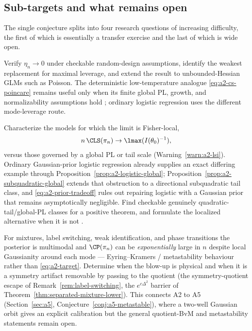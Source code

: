 \documentclass[../../main.tex]{subfiles}
\begin{document}
\subsection{Sub-targets and what remains open}
\label{subsec:a2-open}

The single conjecture splits into four research questions of increasing difficulty, the first
of which is essentially a transfer exercise and the last of which is wide open.

\begin{question}
\label{q:a2-poincare}
Verify $\eta_n\to0$ under checkable random-design assumptions, identify the weakest replacement
for maximal leverage, and extend the result to
unbounded-Hessian GLMs such as Poisson. The deterministic low-temperature analogue
\eqref{eq:a2-cs-poincare} remains useful only when its finite global PL, growth, and
normalizability assumptions hold \cite{ChewiStromme2024Ballistic}; ordinary logistic regression
uses the different mode-leverage route.
\end{question}

\begin{question}
\label{q:a2-lsi}
Characterize the models for which the limit is Fisher-local,
\[
  n\,\CLS(\pi_n)\to\lmax(I(\theta_0)^{-1}),
\]
versus those governed by a global PL or tail scale (Warning~\ref{warn:a2-lsi}). Ordinary
Gaussian-prior logistic regression already supplies an exact differing example through
Proposition~\ref{prop:a2-logistic-global}; Proposition~\ref{prop:a2-subquadratic-global} extends
that obstruction to a directional subquadratic tail class, and
\eqref{eq:a2-prior-tradeoff} rules out repairing logistic with a Gaussian prior that remains
asymptotically negligible. Find checkable genuinely quadratic-tail/global-PL classes for a
positive theorem, and formulate the localized alternative when it is not
\cite{BenNejma2026Lojasiewicz}.
\end{question}

\begin{question}
\label{q:a2-multimodal}
For mixtures, label switching, weak identification, and phase transitions the posterior is
multimodal and $\CP(\pi_n)$ can be \emph{exponentially} large in $n$ despite local Gaussianity
around each mode --- Eyring--Kramers / metastability behaviour rather than \eqref{eq:a2-target}.
Determine when the blow-up is physical and when it is a symmetry artifact removable by passing
to the quotient (the symmetry-quotient escape of Remark~\ref{rem:label-switching}, the
$e^{c\Delta^2}$ barrier of Theorem~\ref{thm:separated-mixture-lower}). This connects A2 to A5
(Section~\ref{sec:a5}, Conjecture~\ref{conj:a5-metastable}), where a two-well Gaussian orbit gives
an explicit calibration but the general quotient-BvM and metastability statements remain open.
\end{question}
\end{document}
